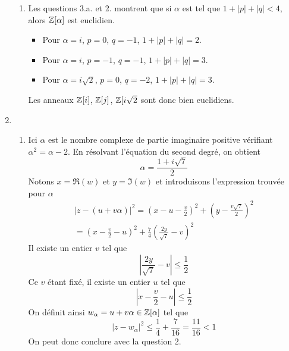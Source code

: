 \begin{enumerate}
\begin{enumerate}
    \item Les questions 3.a. et 2. montrent que si $\alpha$ est tel que $1+|p|+|q|<4$, alors $\mathbb{Z}[\alpha]$ est euclidien.
    \begin{itemize}
      \item Pour $\alpha= i$, $p=0$, $q=-1$, $1+|p|+|q|=2$.
      \item Pour $\alpha= i$, $p=-1$, $q=-1$, $1+|p|+|q|=3$.
      \item Pour $\alpha= i\sqrt{2}$, $p=0$, $q=-2$, $1+|p|+|q|=3$.
    \end{itemize}
Les anneaux $\mathbb{Z}[i]$, $\mathbb{Z}[j]$, $\mathbb{Z}[i\sqrt{2}$ sont donc bien euclidiens.
  \end{enumerate}

  \item
  \begin{enumerate}
    \item Ici $\alpha$ est le nombre complexe de partie imaginaire positive vérifiant $\alpha^2 = \alpha - 2$. En résolvant l'équation du second degré, on obtient
    \begin{displaymath}
      \alpha = \frac{1+i\sqrt{7}}{2}
    \end{displaymath}
Notons $x=\Re(w)$ et $y=\Im(w)$ et introduisons l'expression trouvée pour $\alpha$
\begin{multline*}
  |z-(u+v\alpha)|^2 = \left(x-u-\frac{v}{2} \right)^2 + \left( y-\frac{v\sqrt{7}}{2}\right)^2\\
  = \left(x -\frac{v}{2} - u\right)^2 + \frac{7}{4}\left( \frac{2y}{\sqrt{7}} -v\right)^2  
\end{multline*}
Il existe un entier $v$ tel que 
\begin{displaymath}
 \left|\frac{2y}{\sqrt{7}} -v\right|\leq \frac{1}{2} 
\end{displaymath}
Ce $v$ étant fixé, il existe un entier $u$ tel que
\begin{displaymath}
  \left|x -\frac{v}{2} - u\right|\leq \frac{1}{2}
\end{displaymath}
On définit ainsi $w_{\alpha} = u + v\alpha \in \mathbb{Z}[\alpha]$ tel que 
\begin{displaymath}
  \left|z-w_{\alpha}\right|^2 \leq \frac{1}{4} + \frac{7}{16} = \frac{11}{16} < 1
\end{displaymath}
On peut donc conclure avec la question 2.


\end{enumerate}
\end{enumerate}
